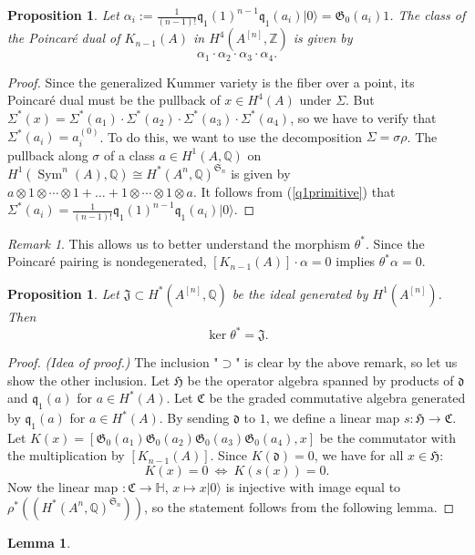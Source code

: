\documentclass{amsart}
\DeclareMathOperator{\Sym}{Sym}
\newcommand{\hilb}[1]{^{[#1]}}
\newcommand{\vac}{|0\rangle}
\newcommand{\G}{\mathfrak{G}}
\newcommand{\q}{\mathfrak{q}}
\newcommand{\pone}{ \mathfrak{p}_{ - 1} }
\newcommand{\kum}[2]{K_{ #2 }( #1 )}
\newcommand{\Q}{\mathbb{Q}}
\newcommand{\Z}{\mathbb{Z}}
\newcommand{\kq}{\mathfrak{q}}
\theoremstyle{plain}
\newtheorem{lemma}[theorem]{Lemma}
\newtheorem{proposition}[theorem]{Proposition}
\theoremstyle{definition}
\theoremstyle{remark}
\newtheorem{remark}[theorem]{Remark}
\begin{document}
\begin{proposition}
Let $\alpha_i := \frac{1}{(n-1)!}\kq_{1}(1)^{n-1}\kq_1(a_i)\vac = \G_0(a_i)1$. The class of the Poincar\'e dual of $\kum{A}{n-1}$ in $H^4(A\hilb{n},\Z)$ is given by
$$
\alpha_1\cdot\alpha_2\cdot\alpha_3\cdot\alpha_4.
$$ 
\end{proposition}
\begin{proof}
Since the generalized Kummer variety is the fiber over a point, its Poincar\'e dual must be the pullback of $x\in H^4(A)$ under $\Sigma$. But $\Sigma^* (x) = \Sigma^*(a_1)\cdot \Sigma^*(a_2)\cdot \Sigma^*(a_3)\cdot \Sigma^*(a_4)$, so we have to verify that $\Sigma^* (a_i) = a_i^{(0)}$. To do this, we want to use the decomposition $\Sigma = \sigma\rho$.
The pullback along $\sigma$ of a class $a\in H^1(A,\Q)$ on $H^1(\Sym^n(A),\Q) \cong H^*(A^n,\Q)^{\mathfrak{S}_n}$ is given by $a\otimes 1\otimes \cdots\otimes 1 + \ldots + 1\otimes \cdots\otimes 1\otimes a$. It follows from (\ref{q1primitive}) that $\Sigma^* (a_i) = \frac{1}{(n-1)!}\kq_{1}(1)^{n-1}\kq_1(a_i)\vac $.
\end{proof}
\begin{remark}
This allows us to better understand the morphism $\theta^*$. Since the Poincar\'e pairing is nondegenerated, $[\kum{A}{n-1}]\cdot \alpha=0$ implies $\theta^* \alpha =0$.
\end{remark}

\begin{proposition}
Let $\mathfrak{J}\subset H^*(A\hilb{n},\Q)$ be the ideal generated by $H^1(A\hilb{n})$. Then 
$$\ker \theta^* = \mathfrak{J} .$$
\end{proposition}
\begin{proof} \emph{(Idea of proof.)}
The inclusion "$\supset$" is clear by the above remark, so let us show the other inclusion.
Let $\mathfrak{H}$ be the operator algebra spanned by products of $\mathfrak d$ and $\q_1(a)$ for $a\in H^*(A)$. Let $\mathfrak C$ be the graded commutative algebra generated by $\q_1(a)$ for $a\in H^*(A)$. By sending $\mathfrak d$ to $1$, we define a linear map $s : \mathfrak H \rightarrow \mathfrak C$.
Let $K(x) = [\mathfrak G_0(a_1)\mathfrak G_0(a_2)\mathfrak G_0(a_3)\mathfrak G_0(a_4), x]$ be the commutator with the multiplication by $[\kum{A}{n-1}]$. Since $K(\mathfrak d)=0$, we have for all $x\in\mathfrak H$:
$$
K(x) = 0 \ \Leftrightarrow \ K(s(x)) = 0.
$$
Now the linear map $: \mathfrak C \rightarrow \mathbb H$, $x\mapsto x\vac$ is injective with image equal to $\rho^*\left((H^*(A^n,\Q)^{\mathfrak S_n})\right)$, so the statement follows from the following lemma.
\end{proof}
\begin{lemma}

\end{lemma}
\end{document}
